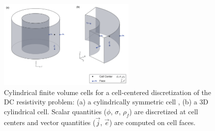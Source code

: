 \begin{figure}
    \begin{center}
    \includegraphics[width=0.6\textwidth]{figures/dc_discretization-06.png}
    \end{center}
\caption{
    Cylindrical finite volume cells for a cell-centered discretization of the DC resistivity problem:
    (a) a cylindrically symmetric cell , (b) a 3D cylindrical cell.
    Scalar quantities ($\phi$, $\sigma$, $\rho_f$) are discretized at cell centers and vector
    quantities ($\vec{j}$, $\vec{e}$) are computed on cell faces.
}
\label{fig:dc_discretization}
\end{figure}

